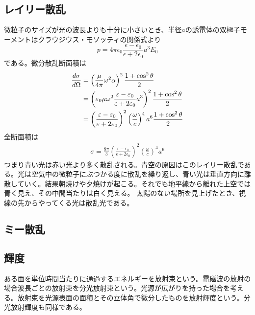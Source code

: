 \subsection{レイリー散乱}
    微粒子のサイズが光の波長よりも十分に小さいとき、半径$a$の誘電体の双極子モーメントはクラウジウス・モソッティの関係式より
        \[p = 4\pi\epsilon_0\frac{\epsilon - \epsilon_0}{\epsilon + 2\epsilon_0}a^3E_0\]
    である。微分散乱断面積は
    \begin{align*}
        \de[\sigma]{\Omega}
            &= \left(\frac{\mu}{4\pi}\omega^2\alpha\right)^2 \frac{1 + \cos^2\theta}{2}\\
            &= \left(\epsilon_0\mu\omega^2\frac{\epsilon - \epsilon_0}{\epsilon + 2\epsilon_0}a^3\right)^2 \frac{1 + \cos^2\theta}{2}\\
            &= \left(\frac{\epsilon - \epsilon_0}{\epsilon + 2\epsilon_0}\right)^2 \left(\frac{\omega}{c}\right)^4 a^6 \frac{1 + \cos^2\theta}{2}
    \end{align*}
    全断面積は
    \begin{align*}
        \sigma = \frac{8\pi}{3}\left(\frac{\epsilon - \epsilon_0}{\epsilon + 2\epsilon_0}\right)^2 \left(\frac{\omega}{c}\right)^4 a^6
    \end{align*}
    つまり青い光は赤い光より多く散乱される。青空の原因はこのレイリー散乱である。光は空気中の微粒子にぶつかる度に散乱を繰り返し、青い光は垂直方向に離散していく。結果朝焼けや夕焼けが起こる。それでも地平線から離れた上空では青く見え、その中間当たりは白く見える。
    太陽のない場所を見上げたとき、視線の先からやってくる光は散乱光である。

\subsection{ミー散乱}

\subsection{輝度}
    ある面を単位時間当たりに通過するエネルギーを放射束という。電磁波の放射の場合波長ごとの放射束を分光放射束という。光源が広がりを持った場合を考える。放射束を光源表面の面積とその立体角で微分したものを放射輝度という。分光放射輝度も同様である。